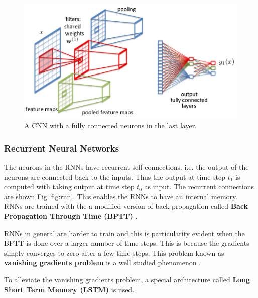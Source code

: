 \documentclass[a4paper]{article}
\begin{document}
\begin{figure}
  \includegraphics[width=.99\linewidth]{img/cnn.png}
  \caption{A CNN with a fully connected neurons in the last layer.}
  \label{fig:cnn}
\end{figure}


\subsubsection{Recurrent Neural Networks}

The neurons in the RNNs have recurrent self  connections. i.e. the output of the
neurons are connected back  to the inputs. Thus the output at time step $t_1$ is
computed with  taking  output  at  time  step  $t_0$  as  input.  The  recurrent
connections are  shown  Fig.\ref{fig:rnn}. This  enables  the  RNNs to  have  an
internal  memory.  RNNs  are  trained  with  the  a  modified  version  of  back
propagation   called    \textbf{Back    Propagation   Through    Time    (BPTT)}
\cite{werbos1990backpropagation}.

RNNs in general are harder to train and  this is particularity  evident when the
BPTT is  done over a larger number of time steps. This is because  the gradients
simply  converges  to  zero  after a  few time  steps.  This  problem  known  as
\textbf{vanishing   gradients   problem}   is   a   well    studied   phenomenon
\cite{bengio1994learning}.

To  alleviate  the  vanishing  gradients problem, a  special architecture called
\textbf{Long Short Term Memory (LSTM)} \cite{hochreiter1997long} is used.
\end{document}
